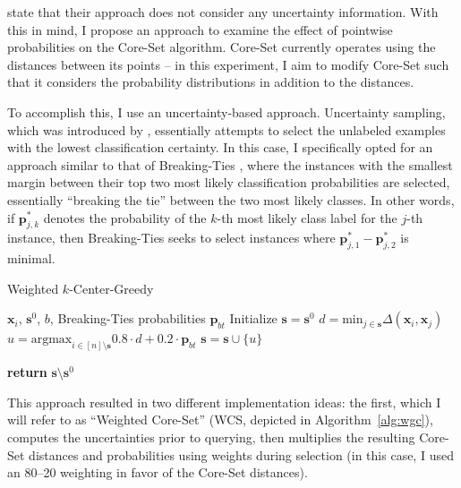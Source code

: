 \documentclass[english,bachelor,ul]{webisthesis} %
\begin{document}
\cite{DBLP:conf/iclr/SenerS18} state that their approach does not consider any uncertainty information. With this in mind, I propose an approach to examine the effect of pointwise probabilities on the Core-Set algorithm. Core-Set currently operates using the distances between its points -- in this experiment, I aim to modify Core-Set such that it considers the probability distributions in addition to the distances.

To accomplish this, I use an uncertainty-based approach. Uncertainty sampling, which was introduced by \cite{DBLP:conf/sigir/LewisG94}, essentially attempts to select the unlabeled examples with the lowest classification certainty. In this case, I specifically opted for an approach similar to that of Breaking-Ties \citep{DBLP:journals/jmlr/LuoKGHSRH05}, where the instances with the smallest margin between their top two most likely classification probabilities are selected, essentially ``breaking the tie'' between the two most likely classes. In other words, if $ \mathbf{p}_{j, k}^* $ denotes the probability of the $ k $-th most likely class label for the $ j $-th instance, then Breaking-Ties seeks to select instances where $ \mathbf{p}_{j, 1}^* - \mathbf{p}_{j, 2}^* $ is minimal.

\begin{algorithm}[htpb]
\caption{Weighted $k$-Center-Greedy}%
\label{alg:wgc}
\begin{algorithmic}

\Require $ \mathbf{x}_i $, $ \mathbf{s}^0 $, $ b $, Breaking-Ties probabilities $ \mathbf{p}_{bt} $
\State Initialize $ \mathbf{s} = \mathbf{s}^0 $
\Repeat
\State $ d = \text{min}_{j \in \mathbf{s}} \Delta(\mathbf{x}_i, \mathbf{x}_j) $ 
    \State $ u = \text{argmax}_{i \in [n] \setminus \mathbf{s}} 0.8 \cdot d + 0.2 \cdot \mathbf{p}_{bt} $
\State $ \mathbf{s} = \mathbf{s} \cup \{u\} $

\State \textbf{return} $\mathbf{s} \setminus \mathbf{s}^0 $
\end{algorithmic}
\end{algorithm}

This approach resulted in two different implementation ideas: the first, which I will refer to as ``Weighted Core-Set'' (WCS, depicted in Algorithm~\ref{alg:wgc}), computes the uncertainties prior to querying, then multiplies the resulting Core-Set distances and probabilities using weights during selection (in this case, I used an 80--20 weighting in favor of the Core-Set distances).
\end{document}
